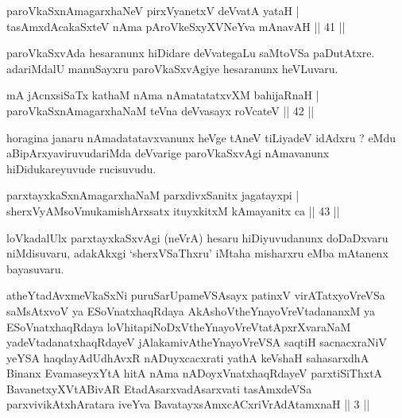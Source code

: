 \begin{shl}
paroVkaSxnAmagarxhaNeV pirxVyanetxV deVvatA yataH |\\
tasAmxdAcakaSxteV nAma pAroVkeSxyXVNeYva mAnavAH \hfill || 41 || 
\end{shl}

\begin{artha}
paroVkaSxvAda hesaranunx hiDidare deVvategaLu saMtoVSa paDutAtxre. adariMdalU manuSayxru paroVkaSxvAgiye hesaranunx heVLuvaru.
\end{artha}


\begin{shl}
mA jAcnxsiSaTx kathaM nAma nAmatatatxvXM bahijaRnaH |\\
paroVkaSxnAmagarxhaNaM teVna deVvasayx roVcateV \hfill || 42 || 
\end{shl}

\begin{artha}
horagina janaru nAmadatatavxvanunx heVge tAneV tiLiyadeV idAdxru ? eMdu aBipArxyaviruvudariMda deVvarige paroVkaSxvAgi nAmavanunx hiDidukareyuvude rucisuvudu.
\end{artha}


\begin{shl}
parxtayxkaSxnAmagarxhaNaM parxdivxSanitx jagatayxpi |\\
sherxVyAMsoV\s mukamishArxsatx ituyxkitxM kAmayanitx ca \hfill || 43 || 
\end{shl}

\begin{artha}
loVkadalUlx parxtayxkaSxvAgi (neVrA) hesaru hiDiyuvudanunx doDaDxvaru niMdisuvaru, adakAkxgi `sherxVSaThxru' iMtaha misharxru eMba mAtanenx bayasuvaru.
\end{artha}

\begin{shl}
atheYtadAvxmeV\s kaSxNi puruSarUpameVSAsayx patinxV virATatxyoVreVSa saMsAtxvoV ya ESoV\s natxhaqRdaya AkAshoV\s theYnayoVreVtadananxM ya ESoV\s natxhaqRdaya loVhitapiNoDxV\s theYnayoVreVtatApxrXvaraNaM yadeVtadanatxhaqRdayeV jAlakamivAtheYnayoVreVSA saqtiH sacnacxraNiV yeYSA haqdayAdUdhAvxR nADuyxcacxrati yathA keVshaH sahasarxdhA Binanx EvamaseyxYtA hitA nAma nADoyxV\s natxhaqRdayeV parxtiSiThxtA BavanetxyXVtABivAR EtadAsarxvadAsarxvati tasAmxdeVSa parxvivikAtxhAratara iveYva BavatayxsAmxcACxriVrAdAtamxnaH || 3 ||
\end{shl}


